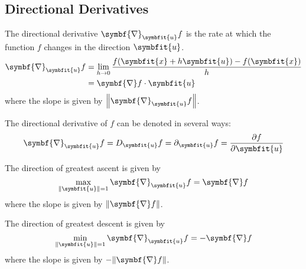 \documentclass{article}
\begin{document}
\subsection{Directional Derivatives}
\begin{definition}
    The directional derivative $\symbf{\nabla}_{\symbfit{u}}f$ is the rate at
    which the function $f$ changes in the direction $\symbfit{u}$.
    \begin{align*}
        \symbf{\nabla}_{\symbfit{u}}f &= \lim_{h \to 0} \frac{f(\symbfit{x} + h\symbfit{u}) - f(\symbfit{x})}{h} \\
        &= \symbf{\nabla}f \cdot \symbfit{u}
    \end{align*}
    where the slope is given by $\norm{\symbf{\nabla}_{\symbfit{u}}f}$.
\end{definition}
\begin{remark}
    The directional derivative of $f$ can be denoted in several ways:
    \begin{equation*}
        \symbf{\nabla}_{\symbfit{u}}f = D_{\symbfit{u}} f = \partial_{\symbfit{u}} f = \pdv{f}{\symbfit{u}}
    \end{equation*}
\end{remark}
\begin{theorem}
    The direction of greatest ascent is given by
    \begin{equation*}
        \max_{\norm{\symbfit{u}} = 1} \symbf{\nabla}_{\symbfit{u}}f = \symbf{\nabla}f
    \end{equation*}
    where the slope is given by $\norm{\symbf{\nabla}f}$.
\end{theorem}
\begin{theorem}
    The direction of greatest descent is given by
    \begin{equation*}
        \min_{\norm{\symbfit{u}} = 1} \symbf{\nabla}_{\symbfit{u}}f = -\symbf{\nabla}f
    \end{equation*}
    where the slope is given by $-\norm{\symbf{\nabla}f}$.
\end{theorem}
\end{document}

